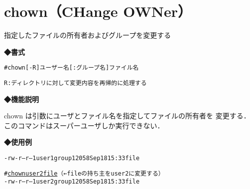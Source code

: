 
\section{chown（CHange OWNer）}
指定したファイルの所有者およびグループを変更する\par
\label{cmd:chown}
\noindent
{\bf ◆書式}
\begin{center}
\begin{screen}
\begin{alltt}
# chown [-R] ユーザー名[:グループ名] ファイル名

    R:ディレクトリに対して変更内容を再帰的に処理する
\end{alltt}
\end{screen}
\end{center}

\noindent
{\bf ◆機能説明}

chown は引数にユーザとファイル名を指定してファイルの所有者を
変更する．このコマンドはスーパーユーザしか実行できない．

\noindent
{\bf ◆使用例}
\begin{center}
\begin{breakbox}
\begin{alltt}
% \underline{ls -l file}  （←fileの詳細な情報を表示する）
-rw-r--r--   1 user1   group1  2058 Sep 18 15:33 file

# \underline{chown user2 file}  （←fileの持ち主をuser2に変更する）
% \underline{ls -l file}
-rw-r--r--   1 user2   group1  2058 Sep 18 15:33 file
%
\end{alltt}
\end{breakbox}
\end{center}
\clearpage
